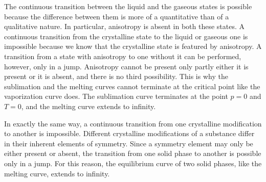 The continuous transition between the liquid and the gaseous states is possible because the difference between them is more of a quantitative than of a qualitative nature. In particular, anisotropy is absent in both these states. A continuous transition from the crystalline state to the liquid or gaseous one is impossible because we know that the crystalline state is featured by anisotropy. A transition from a state with anisotropy to one without it can be performed, however, only in a jump. Anisotropy cannot be present only partly either it is present or it is absent, and there is no third possibility. This is why the sublimation and the melting curves cannot terminate at the critical point like the vaporization curve does. The sublimation curve terminates at the point $p=0$ and $T=0$, and the melting curve extends to infinity.

In exactly the same way, a continuous transition from one crystalline modification to another is impossible. Different crystalline modifications of a substance differ in their inherent elements of symmetry. Since a symmetry element may only be either present or absent, the transition from one solid phase to another is possible only in a jump. For this reason, the equilibrium curve of two solid phases, like the melting curve, extends to infinity.
